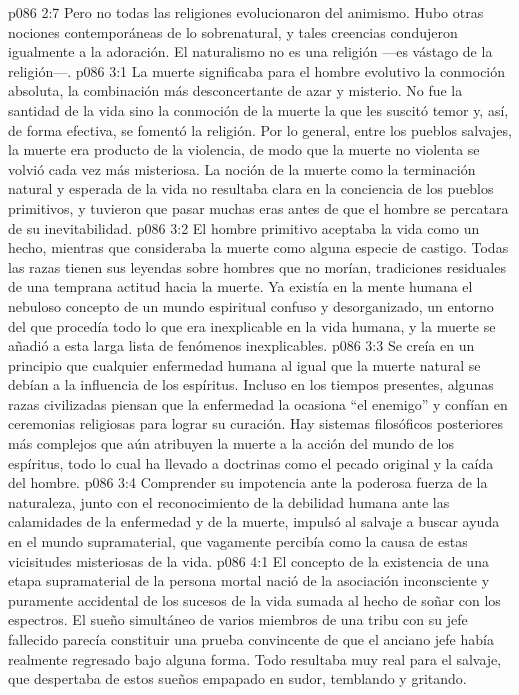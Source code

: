 \vs p086 2:7 Pero no todas las religiones evolucionaron del animismo. Hubo otras nociones contemporáneas de lo sobrenatural, y tales creencias condujeron igualmente a la adoración. El naturalismo no es una religión ---es vástago de la religión---.
\vs p086 3:1 La muerte significaba para el hombre evolutivo la conmoción absoluta, la combinación más desconcertante de azar y misterio. No fue la santidad de la vida sino la conmoción de la muerte la que les suscitó temor y, así, de forma efectiva, se fomentó la religión. Por lo general, entre los pueblos salvajes, la muerte era producto de la violencia, de modo que la muerte no violenta se volvió cada vez más misteriosa. La noción de la muerte como la terminación natural y esperada de la vida no resultaba clara en la conciencia de los pueblos primitivos, y tuvieron que pasar muchas eras antes de que el hombre se percatara de su inevitabilidad.
\vs p086 3:2 \pc El hombre primitivo aceptaba la vida como un hecho, mientras que consideraba la muerte como alguna especie de castigo. Todas las razas tienen sus leyendas sobre hombres que no morían, tradiciones residuales de una temprana actitud hacia la muerte. Ya existía en la mente humana el nebuloso concepto de un mundo espiritual confuso y desorganizado, un entorno del que procedía todo lo que era inexplicable en la vida humana, y la muerte se añadió a esta larga lista de fenómenos inexplicables.
\vs p086 3:3 Se creía en un principio que cualquier enfermedad humana al igual que la muerte natural se debían a la influencia de los espíritus. Incluso en los tiempos presentes, algunas razas civilizadas piensan que la enfermedad la ocasiona “el enemigo” y confían en ceremonias religiosas para lograr su curación. Hay sistemas filosóficos posteriores más complejos que aún atribuyen la muerte a la acción del mundo de los espíritus, todo lo cual ha llevado a doctrinas como el pecado original y la caída del hombre.
\vs p086 3:4 Comprender su impotencia ante la poderosa fuerza de la naturaleza, junto con el reconocimiento de la debilidad humana ante las calamidades de la enfermedad y de la muerte, impulsó al salvaje a buscar ayuda en el mundo supramaterial, que vagamente percibía como la causa de estas vicisitudes misteriosas de la vida.
\vs p086 4:1 El concepto de la existencia de una etapa supramaterial de la persona mortal nació de la asociación inconsciente y puramente accidental de los sucesos de la vida sumada al hecho de soñar con los espectros. El sueño simultáneo de varios miembros de una tribu con su jefe fallecido parecía constituir una prueba convincente de que el anciano jefe había realmente regresado bajo alguna forma. Todo resultaba muy real para el salvaje, que despertaba de estos sueños empapado en sudor, temblando y gritando.

